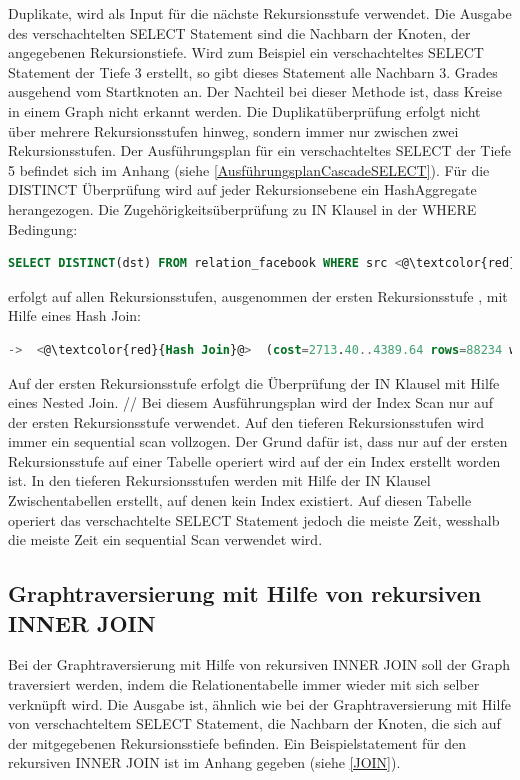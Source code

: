 Duplikate, wird als Input für die nächste Rekursionsstufe verwendet.
Die Ausgabe des verschachtelten SELECT Statement sind die Nachbarn der Knoten, der angegebenen Rekursionstiefe. Wird zum Beispiel ein
verschachteltes SELECT Statement der Tiefe 3 erstellt, so gibt dieses Statement alle Nachbarn 3. Grades ausgehend vom Startknoten an. Der Nachteil bei dieser Methode ist, dass
Kreise in einem Graph nicht erkannt werden. Die Duplikatüberprüfung erfolgt nicht über mehrere Rekursionsstufen hinweg, sondern immer nur zwischen zwei Rekursionsstufen.
Der Ausführungsplan für ein verschachteltes SELECT der Tiefe 5 befindet sich im Anhang (siehe \ref{AusführungsplanCascadeSELECT}). Für die DISTINCT Überprüfung
wird auf jeder Rekursionsebene ein HashAggregate herangezogen. Die Zugehörigkeitsüberprüfung zu IN Klausel in der WHERE Bedingung:
\begin{lstlisting}[language=SQL,caption = IN Klausel,frame=single, label={INKlauselFacebook} ]
    SELECT DISTINCT(dst) FROM relation_facebook WHERE src <@\textcolor{red}{IN}@> ()
\end{lstlisting}
erfolgt auf allen Rekursionsstufen, ausgenommen der ersten Rekursionsstufe , mit Hilfe eines Hash Join:
\begin{lstlisting}[language=SQL,caption = Aufruf der DISTINCT Funktion,frame=single, label={WhereConditionCTE} ]
    ->  <@\textcolor{red}{Hash Join}@>  (cost=2713.40..4389.64 rows=88234 width=4) (actual time=11.821..17.797 rows=1709 loops=1)
\end{lstlisting}
 Auf der ersten Rekursionsstufe erfolgt die Überprüfung der IN Klausel mit Hilfe eines Nested Join. // Bei diesem Ausführungsplan wird der Index Scan nur auf der ersten
Rekursionsstufe verwendet. Auf den tieferen Rekursionsstufen wird immer ein sequential scan vollzogen. Der Grund dafür ist, dass nur auf der ersten Rekursionsstufe auf
einer Tabelle operiert wird auf der ein Index erstellt worden ist. In den tieferen Rekursionsstufen werden mit Hilfe der IN Klausel Zwischentabellen erstellt, auf denen kein Index existiert.
 Auf diesen Tabelle operiert das verschachtelte SELECT Statement jedoch die meiste Zeit, wesshalb die meiste Zeit ein sequential Scan verwendet wird.
\subsection{Graphtraversierung mit Hilfe von rekursiven INNER JOIN}
Bei der Graphtraversierung mit Hilfe von rekursiven INNER JOIN soll der Graph traversiert werden, indem die Relationentabelle immer wieder mit sich selber verknüpft wird.
Die Ausgabe ist, ähnlich wie bei der Graphtraversierung mit Hilfe von verschachteltem SELECT Statement, die Nachbarn der Knoten, die sich auf der mitgegebenen Rekursionsstiefe
befinden. Ein Beispielstatement für den rekursiven INNER JOIN ist im Anhang gegeben (siehe \ref{JOIN}).

